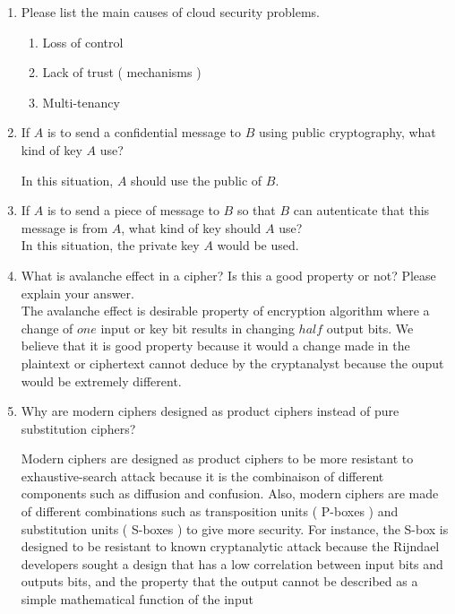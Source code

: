 \documentclass[12]{article}
\begin{document}
	\begin{enumerate}
		\item Please  list the main causes of cloud security problems. 
			\begin{enumerate}
				The following are the causes of cloud security problems.
				
				\item Loss of control 
				\item Lack of trust ( mechanisms ) 
				\item Multi-tenancy
			\end{enumerate}
			
			\item If $A$ is to send a confidential message to $B$ using public cryptography, what kind of key $A$ use?
			
			In this situation, $A$ should use the public of $B$. 
			
			\item If $A$ is to send a piece of message to $B$ so that $B$ can autenticate that this  message is  from $A$, what kind of key should $A$ use? \\
			
			In this situation, the private key $A$ would be used.
			
			\item What is avalanche effect in a cipher? Is this a good property or not? Please explain your answer. \\
		
			The avalanche effect is desirable property of encryption algorithm where a change of $one$ input or key bit results in changing $half$ output bits.
			We believe that it is good property because it would a change made in the plaintext or ciphertext cannot  deduce by the cryptanalyst because the ouput would be extremely different. 
			
			\item Why are modern ciphers designed as product ciphers instead of pure substitution ciphers?
			
			Modern ciphers are designed as product ciphers to be more resistant to exhaustive-search attack because it is the combinaison of different components such as diffusion and confusion. Also, modern ciphers are made of different combinations such as transposition units ( P-boxes ) and substitution units ( S-boxes ) to give more security. For instance, the S-box is designed to be  resistant to known cryptanalytic attack because the Rijndael developers sought a design that has a low correlation between input bits and outputs bits, and the  property that the output cannot be described as a simple mathematical function of the input
			
			
	\end{enumerate}
\end{document}
